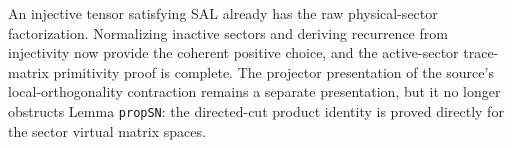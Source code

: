 \documentclass{article}
\begin{document}
An injective tensor satisfying SAL already has the raw physical-sector
factorization. Normalizing inactive sectors and deriving recurrence from
injectivity now provide the coherent positive choice, and the active-sector
trace-matrix primitivity proof is complete. The projector presentation of the
source's local-orthogonality contraction remains a separate presentation, but
it no longer obstructs Lemma \texttt{propSN}: the directed-cut product identity
is proved directly for the sector virtual matrix spaces.



\end{document}

